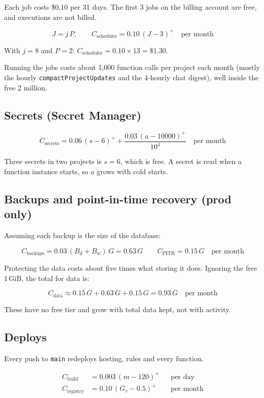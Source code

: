 \documentclass[11pt]{article}
\newcommand{\pos}[1]{\left(#1\right)^{+}}
\begin{document}
Each job costs \$0.10 per 31 days. The first 3 jobs on the billing account are
free, and executions are not billed.

\[
J = j\,P, \qquad
C_{\text{scheduler}} = 0.10\,\pos{J - 3} \quad \text{per month}
\]

With $j = 8$ and $P = 2$: $C_{\text{scheduler}} = 0.10 \times 13 = \$1.30$.

Running the jobs costs about 1{,}000 function calls per project each month
(mostly the hourly \texttt{compactProjectUpdates} and the 4-hourly chat
digest), well inside the free 2 million.

\subsection{Secrets (Secret Manager)}

\[
C_{\text{secrets}} = 0.06\,\pos{s - 6}
                   + \frac{0.03\,\pos{a - 10000}}{10^{4}}
                   \quad \text{per month}
\]

Three secrets in two projects is $s = 6$, which is free. A secret is read when
a function instance starts, so $a$ grows with cold starts.

\subsection{Backups and point-in-time recovery (prod only)}

Assuming each backup is the size of the database:

\[
C_{\text{backups}} = 0.03\,(B_d + B_w)\,G = 0.63\,G
\qquad
C_{\text{PITR}} = 0.15\,G
\quad \text{per month}
\]

Protecting the data costs about five times what storing it does. Ignoring the
free 1\,GiB, the total for data is:

\[
C_{\text{data}} \approx 0.15\,G + 0.63\,G + 0.15\,G = 0.93\,G
\quad \text{per month}
\]

These have no free tier and grow with total data kept, not with activity.

\subsection{Deploys}

Every push to \texttt{main} redeploys hosting, rules and every function.

\begin{align*}
C_{\text{build}} &= 0.003\,\pos{m - 120} && \text{per day} \\
C_{\text{registry}} &= 0.10\,\pos{G_r - 0.5} && \text{per month}
\end{align*}
\end{document}
